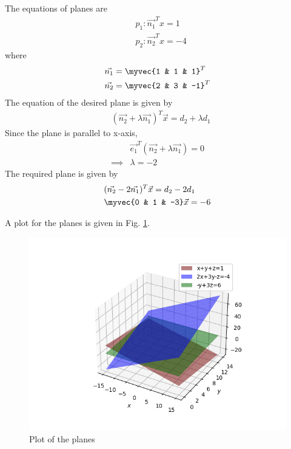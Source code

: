 The equations of planes are
\begin{align}
    &p_1:\vec{{n_1}}^Tx=1\\
    &p_2:\vec{{n_2}}^Tx=-4
\end{align}
where
\begin{align}
    &\vec{n_1}=\myvec{1 & 1 & 1}^T \label{sep/2/40/eq:eq1}\\
    &\vec{n_2}=\myvec{2 & 3 & -1}^T \label{sep/2/40/eq:eq2}
\end{align}
The equation of the desired plane is given by
%
\begin{align}
    & (\vec{n_2}+\lambda \vec{n_1})^T\vec{x}=d_2+\lambda d_1
\end{align}
Since the plane is parallel to x-axis,
\begin{align}
  & \vec{e_1}^T(\vec{n_2}+\lambda \vec{n_1})=0\\
    \implies &\lambda=-2
\end{align}
The required plane is given by
\begin{align}
    &(\vec{n_2}-2\vec{n_1})^T \vec{x}=d_2-2d_1\\
    &\myvec{0 & 1 & -3}\vec{x}=-6
\end{align}
    
A plot for the planes is given in Fig.     \ref{sep/2/40/plot}.

\begin{figure}[!ht]
    \centering
    \includegraphics[width=\columnwidth]{solutions/sep/2/40/plot/Figure_1.png}
    \caption{Plot of the planes}
    \label{sep/2/40/plot}
    \end{figure}
